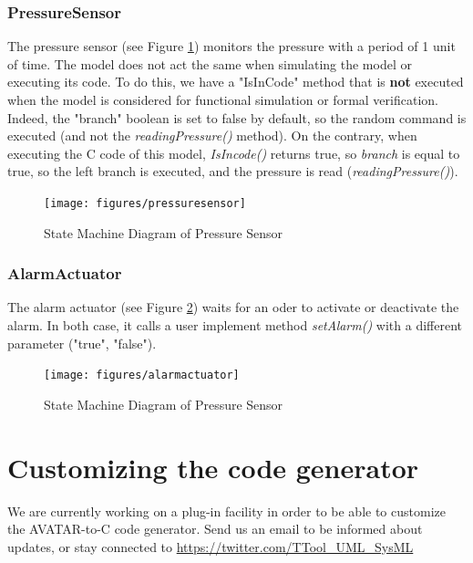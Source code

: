 \documentclass[12pt]{article}
\begin{document}
\subsubsection{PressureSensor}
The pressure sensor (see Figure \ref{fig:ps}) monitors the pressure with a period of 1 unit of time. The model does not act the same when simulating the model or executing its code. To do this, we have a "IsInCode" method that is \textbf{not} executed when the model is considered for functional simulation or formal verification. Indeed, the "branch" boolean is set to false by default, so the random command is executed (and not the \textit{readingPressure()} method). On the contrary, when executing the C code of this model, \textit{IsIncode()} returns true, so \textit{branch} is equal to true, so the left branch is executed, and the pressure is read (\textit{readingPressure()}).  
\begin{figure}[htbp]
\centering
\texttt{[image: figures/pressuresensor]}
\caption{State Machine Diagram of Pressure Sensor} \label{fig:ps}
\end{figure}

\subsubsection{AlarmActuator}
The alarm actuator (see Figure \ref{fig:aa}) waits for an oder to activate or deactivate the alarm. In both case, it calls a user implement method \textit{setAlarm()} with a different parameter ("true", "false").

\begin{figure}[htbp]
\centering
\texttt{[image: figures/alarmactuator]}
\caption{State Machine Diagram of Pressure Sensor} \label{fig:aa}
\end{figure}


\newpage
\section{Customizing the code generator}\label{sec:customgenerator}
We are currently working on a plug-in facility in order to be able to customize the AVATAR-to-C code generator. Send us an email to be informed about updates, or stay connected to \url{https://twitter.com/TTool_UML_SysML}
\end{document}
